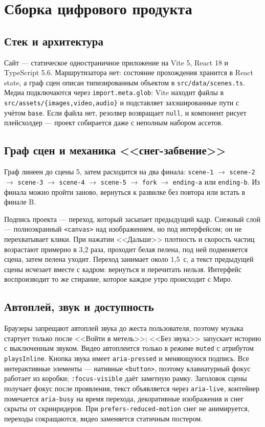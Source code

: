 \documentclass[12pt, a4paper]{article}
\begin{document}
\section{Сборка цифрового продукта}

\subsection{Стек и архитектура}
Сайт --- статическое одностраничное приложение на Vite 5, React 18 и TypeScript 5.6. Маршрутизатора нет: состояние прохождения хранится в React state, а граф сцен описан типизированным объектом в \texttt{src/data/scenes.ts}. Медиа подключаются через \texttt{import.meta.glob}: Vite находит файлы в \texttt{src/assets/\{images,video,audio\}} и подставляет захэшированные пути с учётом \texttt{base}. Если файла нет, резолвер возвращает \texttt{null}, и компонент рисует плейсхолдер --- проект собирается даже с неполным набором ассетов.

\subsection{Граф сцен и механика <<снег-забвение>>}
Граф линеен до сцены 5, затем расходится на два финала: \texttt{scene-1} \(\rightarrow\) \texttt{scene-2} \(\rightarrow\) \texttt{scene-3} \(\rightarrow\) \texttt{scene-4} \(\rightarrow\) \texttt{scene-5} \(\rightarrow\) \texttt{fork} \(\rightarrow\) \texttt{ending-a} или \texttt{ending-b}. Из финала можно пройти заново, вернуться к развилке без повтора или встать в финале B.

Подпись проекта --- переход, который засыпает предыдущий кадр. Снежный слой --- полноэкранный \texttt{<canvas>} над изображением, но под интерфейсом; он не перехватывает клики. При нажатии <<Дальше>> плотность и скорость частиц возрастают примерно в 3{,}2 раза, проходит белая пелена, под ней подменяется сцена, затем пелена уходит. Переход занимает около 1{,}5~с, а текст предыдущей сцены исчезает вместе с кадром: вернуться и перечитать нельзя. Интерфейс воспроизводит то же стирание, которое каждое утро происходит с Миро.

\subsection{Автоплей, звук и доступность}
Браузеры запрещают автоплей звука до жеста пользователя, поэтому музыка стартует только после <<Войти в метель>>; <<Без звука>> запускает историю с выключенным звуком. Видео автоплеится только в режиме \texttt{muted} с атрибутом \texttt{playsInline}. Кнопка звука имеет \texttt{aria-pressed} и меняющуюся подпись. Все интерактивные элементы --- нативные \texttt{<button>}, поэтому клавиатурный фокус работает из коробки; \texttt{:focus-visible} даёт заметную рамку. Заголовок сцены получает фокус после проявления, текст объявляется через \texttt{aria-live}, контейнер помечается \texttt{aria-busy} на время перехода, декоративные изображения и снег скрыты от скринридеров. При \texttt{prefers-reduced-motion} снег не анимируется, переходы сокращаются, видео заменяется статичным постером.
\end{document}
